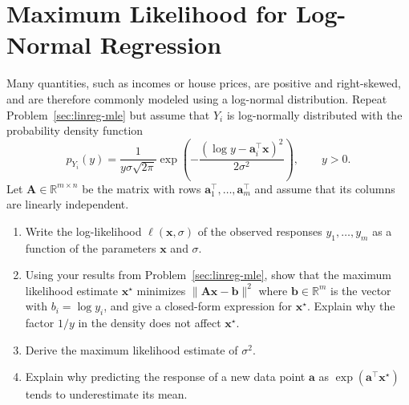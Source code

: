 \documentclass[letterpaper]{article}
\newcommand{\Real}{\mathbb{R}}
\newcommand{\tr}{^\top}
\newcommand{\opt}{^\star}
\begin{document}
\section{Maximum Likelihood for Log-Normal Regression}
Many quantities, such as incomes or house prices, are positive and right-skewed, and are therefore commonly modeled using a log-normal distribution. Repeat Problem~\ref{sec:linreg-mle} but assume that $Y_i$ is log-normally distributed with the probability density function
\[
  p_{Y_i}(y) = \frac{1}{y \sigma \sqrt{2\pi}} \exp\left( -\frac{(\log y - \bm{a}_i\tr \bm{x})^2}{2 \sigma^2} \right), \qquad y > 0.
\]
Let $\bm{A} \in \Real^{m\times n}$ be the matrix with rows $\bm{a}_1\tr, \dots, \bm{a}_m\tr$ and assume that its columns are linearly independent.
\begin{enumerate}
\item Write the log-likelihood $\ell(\bm{x}, \sigma)$ of the observed responses $y_1, \dots, y_m$ as a function of the parameters $\bm{x}$ and $\sigma$.
\item Using your results from Problem~\ref{sec:linreg-mle}, show that the maximum likelihood estimate $\bm{x}\opt$ minimizes $\| \bm{A}\bm{x} - \bm{b} \|^2$ where $\bm{b} \in \Real^m$ is the vector with $b_i = \log y_i$, and give a closed-form expression for $\bm{x}\opt$. Explain why the factor $1/y$ in the density does not affect $\bm{x}\opt$.
\item Derive the maximum likelihood estimate of $\sigma^2$.
\item Explain why predicting the response of a new data point $\bm{a}$ as $\exp(\bm{a}\tr \bm{x}\opt)$ tends to underestimate its mean. 
\end{enumerate}
\end{document}
